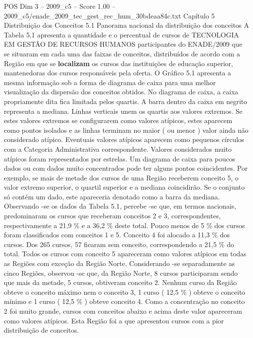 \begin{textsample}{POS Dim 3 – 2009\_c5 – Score 1.00 – 2009\_c5/enade\_2009\_tec\_gest\_rec\_hum\_30bdeaa84c.txt}  \label{ex:f3_pos_132}
Capítulo 5 Distribuição dos Conceitos 5.1 Panorama nacional da distribuição dos conceitos A Tabela 5.1 apresenta a quantidade e o percentual de cursos de TECNOLOGIA EM GESTÃO DE RECURSOS HUMANOS participantes do ENADE/2009 que se situaram em cada uma das faixas de conceitos, distribuídos de acordo com a Região em que se \textbf{localizam} os cursos das instituições de educação superior, mantenedoras dos cursos responsáveis pela oferta.
O Gráfico 5.1 apresenta a mesma informação sob a forma de diagrama de caixa para uma melhor visualização da dispersão dos conceitos obtidos.
No diagrama de caixa, a caixa propriamente dita fica limitada pelos quartis.
A barra dentro da caixa em negrito representa a mediana.
Linhas verticais unem os quartis aos valores extremos.
Se estes valores extremos se configurarem como valores atípicos, estes aparecem como pontos isolados e as linhas terminam no maior ( ou menor ) valor ainda não considerado atípico.
Eventuais valores atípicos aparecem como pequenos círculos com a Categoria Administrativa correspondente.
Valores considerados muito atípicos foram representados por estrelas.
Um diagrama de caixa para poucos dados ou com dados muito concentrados pode ter alguns pontos coincidentes.
Por exemplo, se mais de metade dos cursos de uma Região receberem conceito 5, o valor extremo superior, o quartil superior e a mediana coincidirão.
Se o conjunto só contém um dado, este apareceria denotado como a barra da mediana.
Observando -se os dados da Tabela 5.1, percebe -se que, em termos nacionais, predominaram os cursos que receberam conceitos 2 e 3, correspondentes, respectivamente a 21,9 \% e a 36,2 \% deste total.
Pouco menos de 5 \% dos cursos foram classificados com conceitos 1 e 5.
Conceito 4 foi alocado a 11,3 \% dos cursos.
Dos 265 cursos, 57 ficaram sem conceito, correspondendo a 21,5 \% do total.
Todos os cursos com conceito 5 apareceram como valores atípicos em todas as Regiões com exceção da Região Norte.
Considerando -se separadamente as cinco Regiões, observou -se que, da Região Norte, 8 cursos participaram sendo que mais da metade, 5 cursos, obtiveram conceito 2.
Nenhum curso da Região obteve o conceito máximo nem o conceito 3, 1 curso ( 12,5 \% ) obteve o conceito mínimo e 1 curso ( 12,5 \% ) obteve conceito 4.
Como a concentração no conceito 2 foi muito grande, cursos com conceitos abaixo e acima deste valor apareceram como valores atípicos.
Esta Região foi a que apresentou cursos com a pior distribuição de conceitos.

\end{textsample}
